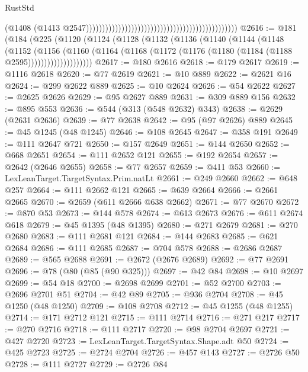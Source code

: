 \begin{lexlean}{RustStd}
\begin{coremodule}
                                                                                              (@1408
                                                                                                (@1413
                                                                                                  @2547)))))))))))))))))))))))))))))))))))))))))))))))
@2616 := @181
    (@184
      (@225
        (@1120
          (@1124
            (@1128
              (@1132
                (@1136
                  (@1140
                    (@1144
                      (@1148
                        (@1152
                          (@1156
                            (@1160
                              (@1164
                                (@1168 (@1172 (@1176 (@1180 (@1184 (@1188 @2595))))))))))))))))))))
@2617 := @180 @2616
@2618 := @179 @2617
@2619 := @1116 @2618
@2620 := @77 @2619
@2621 := @10 @889
@2622 := @2621 @16
@2624 := @299 @2622 @889
@2625 := @10 @2624
@2626 := @54 @2622
@2627 := @2625 @2626
@2629 := @95 @2627 @889
@2631 := @309 @889 @156
@2632 := @895 @553
@2636 := @544 (@313 (@548 @2632) @343)
@2638 := @2629 (@2631 @2636)
@2639 := @77 @2638
@2642 := @95 (@97 @2626) @889
@2645 := @45 @1245 (@48 @1245)
@2646 := @108 @2645
@2647 := @358 @191
@2649 := @111 @2647 @721
@2650 := @157 @2649
@2651 := @144 @2650
@2652 := @668 @2651
@2654 := @111 @2652 @121
@2655 := @192 @2654
@2657 := @2642 (@2646 @2655)
@2658 := @77 @2657
@2659 := @411 @53
@2660 := LexLeanTarget.TargetSyntax.Prim.natLt
@2661 := @249 @2660
@2662 := @648 @257
@2664 := @111 @2662 @121
@2665 := @639 @2664
@2666 := @2661 @2665
@2670 := @2659 (@611 @2666 @638 @2662)
@2671 := @77 @2670
@2672 := @870 @53
@2673 := @144 @578
@2674 := @613 @2673
@2676 := @611 @2674 @618
@2679 := @45 @1395 (@48 @1395)
@2680 := @271 @2679
@2681 := @270 @2680
@2683 := @111 @2681 @121
@2684 := @144 @2683
@2685 := @621 @2684
@2686 := @111 @2685
@2687 := @704 @578
@2688 := @2686 @2687
@2689 := @565 @2688
@2691 := @2672 (@2676 @2689)
@2692 := @77 @2691
@2696 := @78 (@80 (@85 (@90 @325)))
@2697 := @42 @84
@2698 := @10 @2697
@2699 := @54 @18
@2700 := @2698 @2699
@2701 := @52 @2700
@2703 := @2696 @2701 @51
@2704 := @42 @89
@2705 := @936 @2704
@2708 := @45 @1250 (@48 @1250)
@2709 := @108 @2708
@2712 := @45 @1255 (@48 @1255)
@2714 := @171 @2712 @121
@2715 := @111 @2714
@2716 := @271 @217
@2717 := @270 @2716
@2718 := @111 @2717
@2720 := @98 @2704 @2697
@2721 := @427 @2720
@2723 := LexLeanTarget.TargetSyntax.Shape.adt @50
@2724 := @425 @2723
@2725 := @2724 @2704
@2726 := @457 @143
@2727 := @2726 @50
@2728 := @111 @2727
@2729 := @2726 @84

\end{coremodule}
\end{lexlean}
